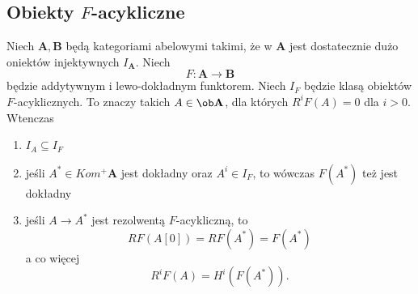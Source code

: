 \subsection{Obiekty $F$-acykliczne}

\begin{theorem}
  Niech $\mathbf{A},\mathbf{B}$ będą kategoriami abelowymi takimi, że w $\mathbf{A}$ jest dostatecznie dużo oniektów injektywnych $I_\mathbf{A}$. Niech 
  $$F:\mathbf{A}\to \mathbf{B}$$
  będzie addytywnym i lewo-dokładnym funktorem. Niech $I_F$ będzie klasą obiektów $F$-acyklicznych. To znaczy takich $A\in\ob\mathbf{A}$, dla których $R^iF(A)=0$ dla $i>0$. Wtenczas
  \begin{enumerate} 
    \item $I_A\subseteq I_F$
    \item jeśli $A^*\in Kom^+\mathbf{A}$ jest dokładny oraz $A^i\in I_F$, to wówczas $F(A^*)$ też jest dokładny
    \item jeśli $A\to A^*$ jest rezolwentą $F$-acykliczną, to 
      $$RF(A[0])=RF(A^*)=F(A^*)$$
      a co więcej
      $$R^iF(A)=H^i(F(A^*)).$$
  \end{enumerate}
\end{theorem}

